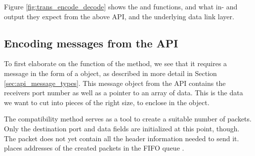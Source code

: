 Figure \ref{fig:trans_encode_decode} shows the  and  functions, and what in- and output they expect from the above API, and the underlying data link layer.


\subsection{Encoding messages from the API}
To first elaborate on the function of the  method, we see that it requires a message in the form of a  object, as described in more detail in Section \ref{sec:api_message_types}. This message object from the API contains the receivers port number as well as a pointer to an array of data. This is the data we want to cut into pieces of the right size, to enclose in the  object.

The compatibility method  serves as a tool to create a suitable number of packets. Only the destination port and data fields are initialized at this point, though. The packet does not yet contain all the header information needed to send it.  places addresses of the created packets in the FIFO queue .

